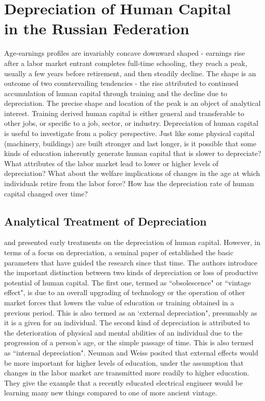 \documentclass[12pt,a4paper]{article}
\numberwithin{equation}{section}
\begin{document}

\section*{Depreciation of Human Capital \\ in the Russian Federation}

Age-earnings profiles are invariably concave downward shaped - earnings rise after a labor market entrant completes full-time schooling, they reach a peak, usually a few years before retirement, and then steadily decline. The shape is an outcome of two countervailing tendencies - the rise attributed to continued accumulation of human capital through training and the decline due to depreciation. The precise shape and location of the peak is an object of analytical interest. Training derived human capital is either general and transferable to other jobs, or specific to a job, sector, or industry. Depreciation of human capital is useful to investigate from a policy perspective. Just like some physical capital (machinery, buildings) are built stronger and last longer, is it possible that some kinds of education inherently generate human capital that is slower to depreciate? What attributes of the labor market lead to lower or higher levels of depreciation? What about the welfare implications of changes in the age at which individuals retire from the labor force? How has the depreciation rate of human capital changed over time? 

\subsection*{Analytical Treatment of Depreciation} 

\citet{rosen_176._1976}  and \citet{mincer_175._1982} presented early treatments on the depreciation of human capital. However, in terms of a focus on depreciation, a seminal paper of \citet{neuman_091._1995} established the basic parameters that have guided the research since that time. The authors introduce the important distinction between two kinds of depreciation or loss of productive potential of human capital. The first one, termed as ``obsolescence" or ``vintage effect", is due to an overall upgrading of technology or the operation of other market forces that lowers the value of education or training obtained in a previous period. This is also termed as an `external depreciation", presumably as it is a given for an individual. The second kind of depreciation is attributed to the deterioration of physical and mental abilities of an individual due to the progression of a person's age, or the simple passage of time. This is also termed as ``internal depreciation". Neuman and Weiss posited that external effects would be more important for higher levels of education, under the assumption that changes in the labor market are transmitted more readily to higher education. They give the example that a recently educated electrical engineer would be learning many new things compared to one of more ancient vintage. 
\end{document}
